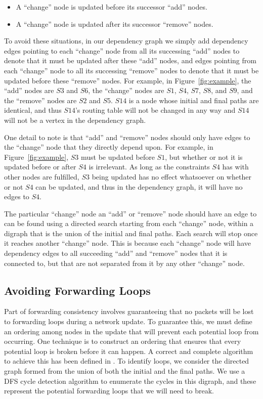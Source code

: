 \documentclass[pageno]{jpaper}
\begin{document}
\begin{itemize}
\item A ``change'' node is updated before its successor ``add'' nodes.
\item A ``change'' node is updated after its successor ``remove'' nodes.\\
\end{itemize}

To avoid these situations, in our dependency graph we simply add dependency edges pointing to each ``change'' node from all its successing ``add'' nodes to denote that it must be updated after these ``add'' nodes, and edges pointing from each ``change'' node to all its successing ``remove'' nodes to denote that it must be updated before these ``remove'' nodes. For example, in Figure~\ref{fig:example}, the ``add'' nodes are $S3$ and $S6$, the ``change'' nodes are $S1$, $S4$, $S7$, $S8$, and $S9$, and the ``remove'' nodes are $S2$ and $S5$. $S14$ is a node whose initial and final paths are identical, and thus $S14$'s routing table will not be changed in any way and $S14$ will not be a vertex in the dependency graph.

One detail to note is that ``add'' and ``remove'' nodes should only have edges to the ``change'' node that they directly depend upon. For example, in Figure~\ref{fig:example}, $S3$ must be updated before $S1$, but whether or not it is updated before or after $S4$ is irrelevant. As long as the constraints $S4$ has with other nodes are fulfilled, $S3$ being updated has no effect whatsoever on whether or not $S4$ can be updated, and thus in the dependency graph, it will have no edges to $S4$.

The particular ``change'' node an ``add'' or ``remove'' node should have an edge to can be found using a directed search starting from each ``change'' node, within a digraph that is the union of the initial and final paths. Each search will stop once it reaches another ``change'' node. This is because each ``change'' node will have dependency edges to all succeeding ``add'' and ``remove'' nodes that it is connected to, but that are not separated from it by any other ``change'' node.

\subsection{Avoiding Forwarding Loops}
\label{subsec:loops}
Part of forwarding consistency involves guaranteeing that no packets will be lost to forwarding loops during a network update. To guarantee this, we must define an ordering among nodes in the update that will prevent each potential loop from occurring. One technique is to construct an ordering that ensures that every potential loop is broken before it can happen. A correct and complete algorithm to achieve this has been defined in \cite{vanbever11}. To identify loops, we consider the directed graph formed from the union of both the initial and the final paths. We use a DFS cycle detection algorithm to enumerate the cycles in this digraph, and these represent the potential forwarding loops that we will need to break.
\end{document}
